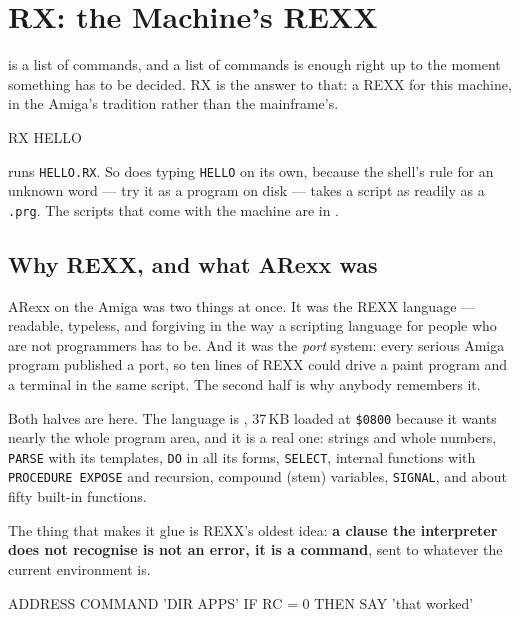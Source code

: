 \chapter{RX: the Machine's REXX}\label{cha:rx}

 is a list of commands, and a list of commands is
enough right up to the moment something has to be decided. RX is the
answer to that: a REXX for this machine, in the Amiga's tradition rather
than the mainframe's.

\begin{type}
RX HELLO
\end{type}

\noindent runs \texttt{HELLO.RX}. So does typing \verb|HELLO| on its own,
because the shell's rule for an unknown word --- try it as a program on
disk --- takes a script as readily as a \texttt{.prg}. The scripts that
come with the machine are in .

\section{Why REXX, and what ARexx was}
ARexx on the Amiga was two things at once. It was the REXX language ---
readable, typeless, and forgiving in the way a scripting language for
people who are not programmers has to be. And it was the \emph{port}
system: every serious Amiga program published a port, so ten lines of
REXX could drive a paint program and a terminal in the same script. The
second half is why anybody remembers it.

Both halves are here. The language is , 37\,KB loaded
at \texttt{\$0800} because it wants nearly the whole program area, and it
is a real one: strings and whole numbers, \verb|PARSE| with its
templates, \verb|DO| in all its forms, \verb|SELECT|, internal functions
with \verb|PROCEDURE EXPOSE| and recursion, compound (stem) variables,
\verb|SIGNAL|, and about fifty built-in functions.

The thing that makes it glue is REXX's oldest idea: \textbf{a clause the
interpreter does not recognise is not an error, it is a command}, sent
to whatever the current environment is.

\begin{type}
ADDRESS COMMAND
'DIR APPS'
IF RC = 0 THEN SAY 'that worked'
\end{type}

